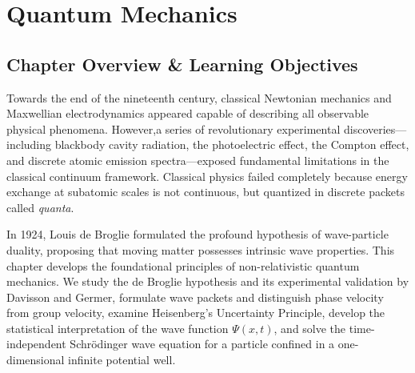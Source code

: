 \chapter{Quantum Mechanics}
\label{chap:quantum-mechanics}

\section{Chapter Overview \& Learning Objectives}
Towards the end of the nineteenth century, classical Newtonian mechanics and Maxwellian electrodynamics appeared capable of describing all observable physical phenomena. However,a series of revolutionary experimental discoveries—including blackbody cavity radiation, the photoelectric effect, the Compton effect, and discrete atomic emission spectra—exposed fundamental limitations in the classical continuum framework. Classical physics failed completely because energy exchange at subatomic scales is not continuous, but quantized in discrete packets called \textit{quanta}.

In 1924, Louis de Broglie formulated the profound hypothesis of wave-particle duality, proposing that moving matter possesses intrinsic wave properties. This chapter develops the foundational principles of non-relativistic quantum mechanics. We study the de Broglie hypothesis and its experimental validation by Davisson and Germer, formulate wave packets and distinguish phase velocity from group velocity, examine Heisenberg's Uncertainty Principle, develop the statistical interpretation of the wave function $\Psi(x,t)$, and solve the time-independent Schrödinger wave equation for a particle confined in a one-dimensional infinite potential well.

